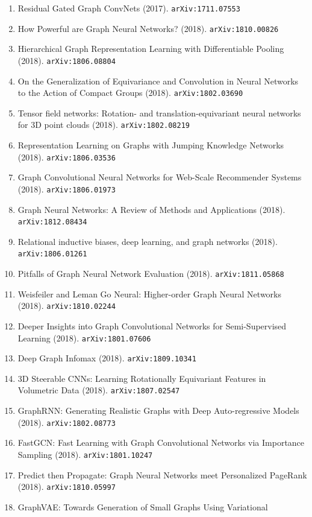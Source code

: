 \documentclass[11pt]{article}
\begin{document}
\begin{enumerate}
  \item Residual Gated Graph ConvNets (2017). \texttt{arXiv:1711.07553}
  \item How Powerful are Graph Neural Networks? (2018). \texttt{arXiv:1810.00826}
  \item Hierarchical Graph Representation Learning with Differentiable Pooling (2018). \texttt{arXiv:1806.08804}
  \item On the Generalization of Equivariance and Convolution in Neural Networks
  to the Action of Compact Groups (2018). \texttt{arXiv:1802.03690}
  \item Tensor field networks: Rotation- and translation-equivariant neural
  networks for 3D point clouds (2018). \texttt{arXiv:1802.08219}
  \item Representation Learning on Graphs with Jumping Knowledge Networks (2018). \texttt{arXiv:1806.03536}
  \item Graph Convolutional Neural Networks for Web-Scale Recommender Systems (2018). \texttt{arXiv:1806.01973}
  \item Graph Neural Networks: A Review of Methods and Applications (2018). \texttt{arXiv:1812.08434}
  \item Relational inductive biases, deep learning, and graph networks (2018). \texttt{arXiv:1806.01261}
  \item Pitfalls of Graph Neural Network Evaluation (2018). \texttt{arXiv:1811.05868}
  \item Weisfeiler and Leman Go Neural: Higher-order Graph Neural Networks (2018). \texttt{arXiv:1810.02244}
  \item Deeper Insights into Graph Convolutional Networks for Semi-Supervised
  Learning (2018). \texttt{arXiv:1801.07606}
  \item Deep Graph Infomax (2018). \texttt{arXiv:1809.10341}
  \item 3D Steerable CNNs: Learning Rotationally Equivariant Features in
  Volumetric Data (2018). \texttt{arXiv:1807.02547}
  \item GraphRNN: Generating Realistic Graphs with Deep Auto-regressive Models (2018). \texttt{arXiv:1802.08773}
  \item FastGCN: Fast Learning with Graph Convolutional Networks via Importance
  Sampling (2018). \texttt{arXiv:1801.10247}
  \item Predict then Propagate: Graph Neural Networks meet Personalized PageRank (2018). \texttt{arXiv:1810.05997}
  \item GraphVAE: Towards Generation of Small Graphs Using Variational

\end{enumerate}
\end{document}
